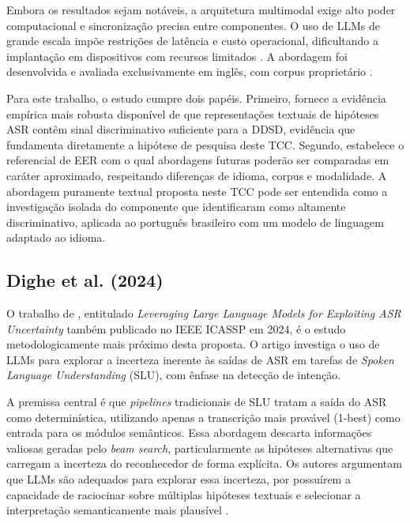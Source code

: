 \documentclass[
    12pt,                %
    openright,           %
    oneside,             %
    a4paper,             %
    english,             %
    brazil               %
]{abntex2}
\begin{document}
Embora os resultados sejam notáveis, a arquitetura multimodal exige alto
poder computacional e sincronização precisa entre componentes. O uso de
LLMs de grande escala impõe restrições de latência e custo operacional,
dificultando a implantação em dispositivos com recursos limitados
\cite{Xu2024}. A abordagem foi desenvolvida e avaliada exclusivamente em
inglês, com corpus proprietário \cite{Wagner2024}.

Para este trabalho, o estudo cumpre dois papéis. Primeiro, fornece a
evidência empírica mais robusta disponível de que representações textuais
de hipóteses ASR contêm sinal discriminativo suficiente para a DDSD, evidência que fundamenta diretamente a hipótese de pesquisa deste TCC.
Segundo, estabelece o referencial de EER com o qual abordagens futuras
poderão ser comparadas em caráter aproximado, respeitando diferenças de
idioma, corpus e modalidade. A abordagem puramente textual proposta neste
TCC pode ser entendida como a investigação isolada do componente que
 identificaram como altamente discriminativo,
aplicada ao português brasileiro com um modelo de linguagem adaptado ao
idioma.


\subsection{Dighe et al. (2024)}

O trabalho de , entitulado \textit{Leveraging Large Language Models for Exploiting ASR Uncertainty} também publicado no IEEE ICASSP em 2024, é o estudo metodologicamente mais próximo desta proposta. O artigo investiga o uso de LLMs para explorar a incerteza inerente às saídas de ASR em tarefas de \textit{Spoken Language Understanding} (SLU), com ênfase na detecção de intenção.

A premissa central é que \textit{pipelines} tradicionais de SLU tratam a saída do ASR como determinística, utilizando apenas a transcrição mais provável (1-best) como entrada para os módulos semânticos. Essa abordagem descarta informações valiosas geradas pelo \textit{beam search}, particularmente as hipóteses alternativas que carregam a incerteza do reconhecedor de forma explícita. Os autores argumentam que LLMs são adequados para explorar essa incerteza, por possuírem a capacidade de raciocinar sobre múltiplas hipóteses textuais e selecionar a interpretação semanticamente mais plausível \cite{Dighe2024}.
\end{document}
